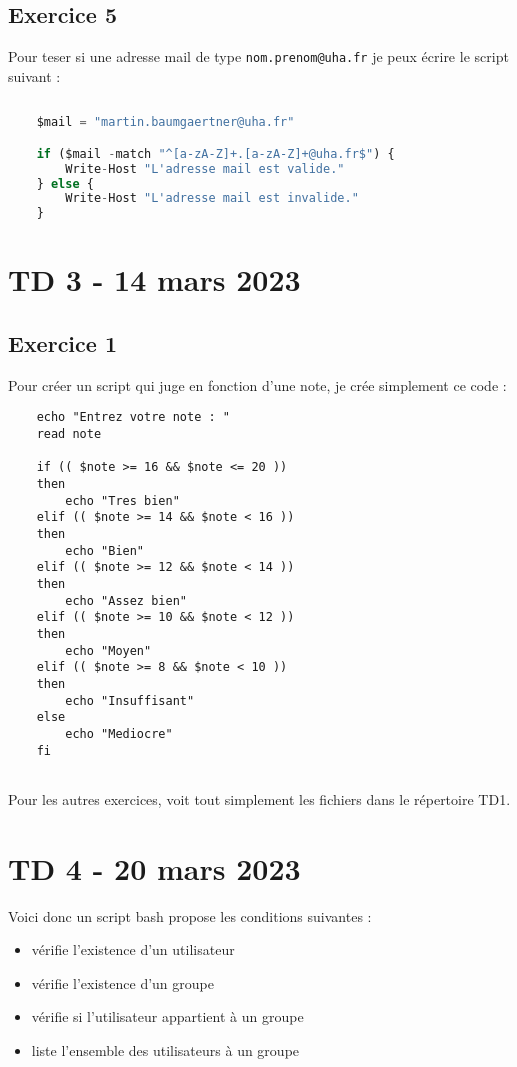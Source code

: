 \documentclass[12pt, a4paper]{article}
\begin{document}
\subsection{Exercice 5}

Pour teser si une adresse mail de type \texttt{nom.prenom@uha.fr} je peux écrire le script suivant :

\begin{lstlisting}[language=Python]
    
    $mail = "martin.baumgaertner@uha.fr"

    if ($mail -match "^[a-zA-Z]+.[a-zA-Z]+@uha.fr$") {
        Write-Host "L'adresse mail est valide."
    } else {
        Write-Host "L'adresse mail est invalide."
    }

\end{lstlisting}

\newpage
\section{TD 3 - 14 mars 2023}

\subsection{Exercice 1}
Pour créer un script qui juge en fonction d'une note, je crée simplement 
ce code : 
\begin{lstlisting}
    echo "Entrez votre note : "
    read note

    if (( $note >= 16 && $note <= 20 ))
    then
        echo "Tres bien"
    elif (( $note >= 14 && $note < 16 ))
    then
        echo "Bien"
    elif (( $note >= 12 && $note < 14 ))
    then
        echo "Assez bien"
    elif (( $note >= 10 && $note < 12 ))
    then
        echo "Moyen"
    elif (( $note >= 8 && $note < 10 ))
    then
        echo "Insuffisant"
    else
        echo "Mediocre"
    fi
    
\end{lstlisting}

Pour les autres exercices, voit tout simplement les fichiers dans le répertoire 
TD1. 

\newpage
\section{TD 4 - 20 mars 2023}
Voici donc un script bash propose les conditions suivantes : 
\begin{itemize}
    \item vérifie l’existence d’un utilisateur
    \item vérifie l’existence d’un groupe
    \item vérifie si l'utilisateur appartient à un groupe
    \item liste l'ensemble des utilisateurs à un groupe
\end{itemize}
\end{document}
